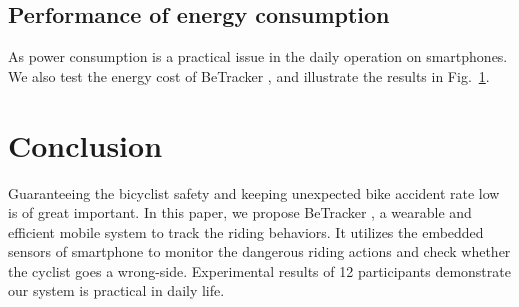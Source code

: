\documentclass{sigchi-ext}
\def\sysname{BeTracker }
\begin{document}
\subsection{Performance of energy consumption}
As power consumption is a practical issue in the daily operation on smartphones. We also test the energy cost of \sysname, and illustrate the results in Fig.~\ref{}.

\section{Conclusion}
Guaranteeing the bicyclist safety and keeping unexpected bike accident rate low is of great important. In this paper, we propose \sysname, a wearable and efficient mobile system to track the riding behaviors. It utilizes the embedded sensors of smartphone to monitor the dangerous riding actions and check whether the cyclist goes a wrong-side. Experimental results of 12 participants demonstrate our system is practical in daily life. 


\end{document}
